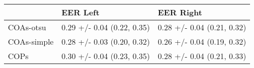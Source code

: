 \begin{tabular}{lll}
\toprule
{} &                    EER Left &                   EER Right \\
\midrule
COAs-otsu   &  0.29 +/- 0.04 (0.22, 0.35) &  0.28 +/- 0.04 (0.21, 0.32) \\
COAs-simple &  0.28 +/- 0.03 (0.20, 0.32) &  0.26 +/- 0.04 (0.19, 0.32) \\
COPs        &  0.30 +/- 0.04 (0.23, 0.35) &  0.28 +/- 0.04 (0.21, 0.33) \\
\bottomrule
\end{tabular}
